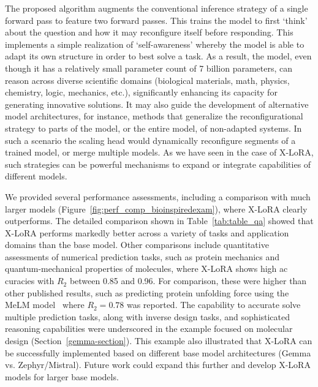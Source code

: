 The proposed algorithm augments the conventional inference strategy of a single forward pass to feature two forward passes. This trains the model to first `think' about the question and how it may reconfigure itself before responding. This implements a simple realization of `self-awareness’ whereby the model is able to adapt its own structure in order to best solve a task. As a result, the model, even though it has a relatively small parameter count of 7 billion parameters, can reason across diverse scientific domains (biological materials, math, physics, chemistry, logic, mechanics, etc.), significantly enhancing its capacity for generating innovative solutions. It may also guide the development of alternative model architectures, for instance, methods that generalize the reconfigurational strategy to parts of the model, or the entire model, of non-adapted systems. In such a scenario the scaling head would dynamically reconfigure segments of a trained model, or merge multiple models. As we have seen in the case of X-LoRA, such strategies can be powerful mechanisms to expand or integrate capabilities of different models.

We provided several performance assessments, including a comparison with much larger models (Figure~\ref{fig:perf_comp_bioinspiredexam}), where X-LoRA clearly outperforms. The detailed comparison shown in Table~\ref{tab:table_qa} showed that X-LoRA performs markedly better across a variety of tasks and application domains than the base model. Other comparisons include quantitative assessments of numerical prediction tasks, such as protein mechanics and quantum-mechanical properties of molecules, where X-LoRA shows high ac curacies with $R_2$ between 0.85 and 0.96. For comparison, these were higher than other published results, such as predicting protein unfolding force using the MeLM model~\cite{Buehler2023MeLMProblemsb} where  $R_2=0.78$ was reported. The capability to accurate solve multiple prediction tasks, along with inverse design tasks, and sophisticated reasoning capabilities were underscored in the example focused on molecular design (Section~\ref{gemma-section}). This example also illustrated that X-LoRA can be successfully implemented based on different base model architectures (Gemma vs. Zephyr/Mistral). Future work could expand this further and develop X-LoRA models for larger base models. 
 
